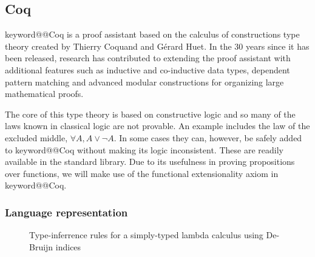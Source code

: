 \documentclass[11pt, final]{article}
\makeatletter
\def\<#1>{\csname keyword@@#1\endcsname}
\makeatother
\begin{document}

\subsection{Coq}

\<Coq> is a proof assistant based on the calculus of constructions type theory created by Thierry Coquand and G\'{e}rard Huet\cite{Coquand1988}.
In the 30 years since it has been released, research has contributed to extending the proof assistant with additional features such as inductive and co-inductive data types\cite{Coquand1990}, dependent pattern matching\cite{Sozeau2010} and advanced modular constructions for organizing large mathematical proofs\cite{Sozeau2008}\cite{Mahboubi2013}.

The core of this type theory is based on constructive logic and so many of the laws known in classical logic are not provable.
An example includes the law of the excluded middle, $\forall A, A \vee \neg A$.
In some cases they can, however, be safely added to \<Coq> without making its logic inconsistent. These are readily available in the standard library.
Due to its usefulness in proving propositions over functions, we will make use of the functional extensionality axiom in \<Coq>.

\subsubsection{Language representation}
\label{sec:language_repr}

\begin{figure}
  \label{fig:stlc_infer}
  \caption{Type-inferrence rules for a simply-typed lambda calculus using De-Bruijn indices}
\end{figure}
\end{document}
